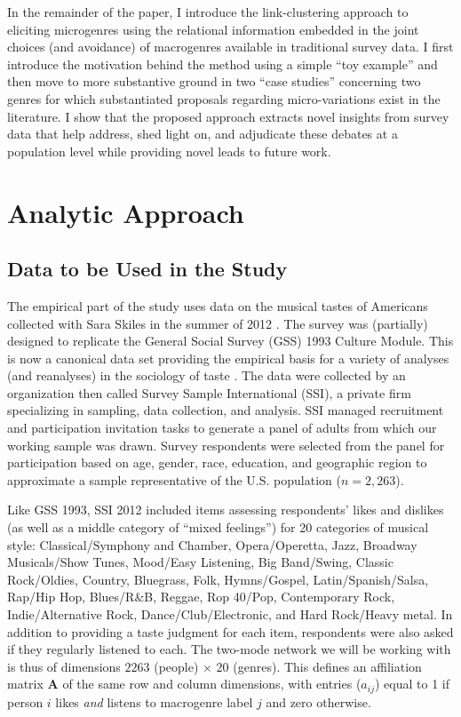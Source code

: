 \documentclass[a4paper,12pt]{extarticle}
\begin{document}
In the remainder of the paper, I introduce the link-clustering approach to eliciting microgenres using the relational information embedded in the joint choices (and avoidance) of macrogenres available in traditional survey data. I first introduce the motivation behind the method using a simple ``toy example'' and then move to more substantive ground in two ``case studies'' concerning two genres for which substantiated proposals regarding micro-variations exist in the literature. I show that the proposed approach extracts novel insights from survey data that help address, shed light on, and adjudicate these debates at a population level while providing novel leads to future work. 

\section{Analytic Approach}
\subsection{Data to be Used in the Study}
The empirical part of the study uses data on the musical tastes of Americans collected with Sara Skiles in the summer of 2012 \citep{lizardo_skiles15, lizardo_skiles16}. The survey was (partially) designed to replicate the General Social Survey (GSS) 1993 Culture Module. This is now a canonical data set providing the empirical basis for a variety of analyses (and reanalyses) in the sociology of taste \citep[e.g.,][]{bryson96, goldberg2011mapping, schultz2010strength, han2003unraveling, tampubolon2008revisiting, okada2017structure}.  The data were collected by an organization then called Survey Sample International (SSI), a private firm specializing in sampling, data collection, and analysis. SSI managed recruitment and participation invitation tasks to generate a panel of adults from which our working sample was drawn. Survey respondents were selected from the panel for participation based on age, gender, race, education, and geographic region to approximate a sample representative of the U.S. population ($n = 2,263$). 

Like GSS 1993, SSI 2012 included items assessing respondents’ likes and dislikes (as well as a middle category of ``mixed feelings'') for 20 categories of musical style: Classical/Symphony and Chamber, Opera/Operetta, Jazz, Broadway Musicals/Show Tunes, Mood/Easy Listening, Big Band/Swing, Classic Rock/Oldies, Country, Bluegrass, Folk, Hymns/Gospel, Latin/Spanish/Salsa, Rap/Hip Hop, Blues/R\&B, Reggae, Rop 40/Pop, Contemporary Rock, Indie/Alternative Rock, Dance/Club/Electronic, and Hard Rock/Heavy metal. In addition to providing a taste judgment for each item, respondents were also asked if they regularly listened to each. The two-mode network we will be working with is thus of dimensions $2263$ (people) $\times$ $20$ (genres). This defines an affiliation matrix $\mathbf{A}$ of the same row and column dimensions, with entries ($a_{ij}$) equal to 1 if person $i$ likes \textit{and} listens to macrogenre label $j$ and zero otherwise. 
\end{document}
